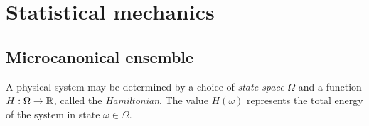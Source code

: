 
\section{Statistical mechanics}


\subsection{Microcanonical ensemble}

A physical system may be determined by a choice of \emph{state space} $\Omega$ and a function
$H : \Omega \rightarrow {\mathbb R}$, called the \emph{Hamiltonian}. The value $H(\omega)$ represents the
total energy of the system in state $\omega\in\Omega$.

